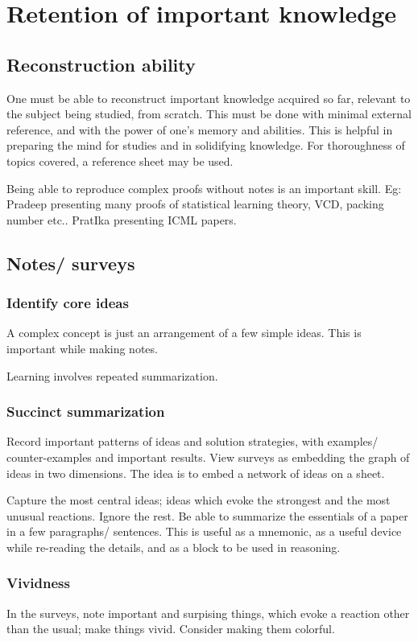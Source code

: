 \documentclass[oneside, article]{memoir}
\begin{document}
\section{Retention of important knowledge}
\subsection{Reconstruction ability}
One must be able to reconstruct important knowledge acquired so far, relevant to the subject being studied, from scratch. This must be done with minimal external reference, and with the power of one's memory and abilities. This is helpful in preparing the mind for studies and in solidifying knowledge. For thoroughness of topics covered, a reference sheet may be used.

Being able to reproduce complex proofs without notes is an important skill. Eg: Pradeep presenting many proofs of statistical learning theory, VCD, packing number etc.. PratIka presenting ICML papers.

\subsection{Notes/ surveys}
\subsubsection{Identify core ideas}
A complex concept is just an arrangement of a few simple ideas. This is important while making notes.

Learning involves repeated summarization.

\subsubsection{Succinct summarization}
Record important patterns of ideas and solution strategies, with examples/ counter-examples and important results. View surveys as embedding the graph of ideas in two dimensions. The idea is to embed a network of ideas on a sheet.

Capture the most central ideas; ideas which evoke the strongest and the most unusual reactions. Ignore the rest. Be able to summarize the essentials of a paper in a few paragraphs/ sentences. This is useful as a mnemonic, as a useful device while re-reading the details, and as a block to be used in reasoning.

\subsubsection{Vividness}
In the surveys, note important and surpising things, which evoke a reaction other than the usual; make things vivid. Consider making them colorful. 
\end{document}
